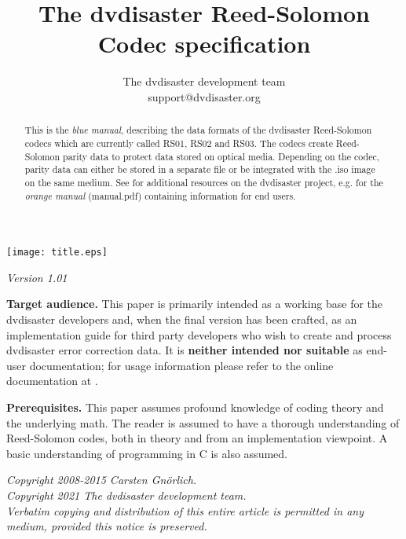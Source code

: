 \documentclass[12pt,a4paper,twoside]{article}
\newcommand{\paperversion}{{\em Version 1.01}}
\begin{document}
\pagecolor{lightblue}
\title{The dvdisaster Reed-Solomon Codec specification}
\author{The dvdisaster development team\\support@dvdisaster.org}
\date{}
\maketitle
\thispagestyle{empty}

\centerline{\texttt{[image: title.eps]}}
  
\begin{center}
\paperversion
\end{center}

\bigskip

\begin{abstract}
This is the {\em blue manual}, describing the data formats of the dvdisaster
Reed-Solomon codecs which are currently called RS01, RS02 and RS03.
The codecs create Reed-Solomon parity data to protect data stored on optical media.
Depending on the codec, parity data can either be stored in a separate file 
or be integrated with the .iso image on the same medium. 
See \homepage for additional resources on the dvdisaster pro\-ject,
e.g. for the {\em orange manual} (manual.pdf) containing information for end users.
\end{abstract}

\bigskip

{\bf Target audience.} This paper is primarily intended as a working base for the
dvdisaster developers and, when the final version has been crafted, as an implementation
guide for third party developers who wish to create and process dvdisaster error correction data.
It is {\bf neither intended nor suitable} as end-user documentation; for usage information
please refer to the online documentation at \homepage.

\bigskip

{\bf Prerequisites.} This paper assumes profound knowledge of coding theory and the 
underlying math. The reader is assumed to have a thorough understanding of Reed-Solomon
codes, both in theory and from an implementation viewpoint. A basic understanding
of programming in C is also assumed.

\vfill
\begin{center}
{\em 
Copyright 2008-2015 Carsten Gnörlich.\\
Copyright 2021 The dvdisaster development team.\\
Verbatim copying and distribution of this entire article is permitted in any medium, 
provided this notice is preserved.}
\end{center}

\newpage
\nopagecolor





\tableofcontents
\newpage









\appendix






\end{document}
